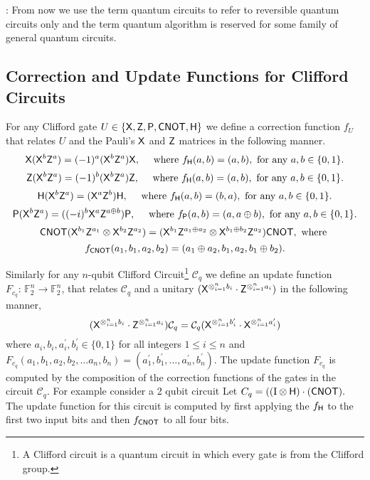 : From now we use the term  quantum circuits to refer to reversible quantum circuits only and the term quantum algorithm is reserved for some family of general quantum circuits.


\subsection{Correction and Update Functions for Clifford Circuits}
\label{correction function}
For any Clifford gate $U\in \{{\sf X}, {\sf Z}, {\sf P}, {\sf CNOT},{\sf H}\}$ we define a correction function $f_U$ that relates  $U$ and the Pauli's $ {\sf X}$ and $ {\sf Z}$ matrices in the following manner.
$${\sf X}({\sf X}^b{\sf Z}^a)=(-1)^a({\sf X}^{b}{\sf Z}^{a}) {\sf X},\quad \mbox{ where }f_{\sf H}(a,b)=(a,b), \mbox{ for any } a, b\in\{0,1\}.$$
$${\sf Z}({\sf X}^b{\sf Z}^a)=(-1)^b({\sf X}^{b}{\sf Z}^{a}) {\sf Z},\quad \mbox{ where }f_{\sf H}(a,b)=(a,b), \mbox{ for any } a, b\in\{0,1\}.$$
$${\sf H}({\sf X}^b{\sf Z}^a)=({\sf X}^{a}{\sf Z}^{b}) {\sf H},\quad \mbox{ where }f_{\sf H}(a,b)=(b,a), \mbox{ for any } a, b\in\{0,1\}.$$
$$ {\sf P}({\sf X}^b{\sf Z}^a)=((-i)^b{\sf X}^a{\sf Z}^{a\oplus b}) {\sf P}, \quad \mbox{ where }f_ {\sf P}(a,b)=(a,a\oplus b), \mbox{ for any } a, b\in\{0,1\}.$$
$${\sf CNOT} ({\sf X}^{b_1}{\sf Z}^{a_1} \otimes {\sf X}^{b_2}{\sf Z}^{a_2})=({{\sf X}^{b_1} {{\sf Z}^{a_1\oplus a_2}}} \otimes {{\sf X}^{b_1\oplus b_2}}{\sf Z}^{a_2}){\sf CNOT}, \mbox{ where }$$ $$f_{{\sf CNOT}}(a_1,b_1,a_2,b_2)=(a_1\oplus a_2,b_1,a_2, b_1\oplus b_2).$$

Similarly for any $n$-qubit Clifford Circuit\footnote{A Clifford circuit is a quantum circuit in which every gate is from the Clifford group.} $\mathcal{C}_q$ we define an update function $F_{c_q}:\, \mathbb{F}_2^n \rightarrow  \mathbb{F}_2^n$, that relates $\mathcal{C}_q$ and a unitary $(  {\sf X}^{\otimes_{i=1}^{n} b_{i}} \cdot  {\sf Z}^{\otimes_{i=1}^{n} a_{i}})$ in the following manner,
$$(  {\sf X}^{\otimes_{i=1}^{n} b_{i}} \cdot  {\sf Z}^{\otimes_{i=1}^{n} a_{i}})\mathcal{C}_q=\mathcal{C}_q (  {\sf X}^{\otimes_{i=1}^{n} b_{i}^\prime} \cdot  {\sf X}^{\otimes_{i=1}^{n} a_{i}^\prime})$$
where $a_i,b_i,a_i^\prime,b_i^\prime \in\{0,1\}$ for all integers  $1\leq i\leq n$ and  $F_{c_q}(a_1,b_1,a_2,b_2, \ldots a_n,b_n)=(a_1^\prime,b_1^\prime, \ldots, a_n^\prime,b_n^\prime).$ The update function $F_{c_q}$ is computed by the composition of the correction functions of the gates in the circuit $\mathcal{C}_q.$ For example consider a 2 qubit circuit Let $C_q=({\rm (I \otimes {\sf H})\cdot ({\sf CNOT})}.$ The update function for this circuit is computed by first applying the $f_{\sf H}$ to the first two input bits and then $f_{{\sf CNOT}}$ to all four bits.

